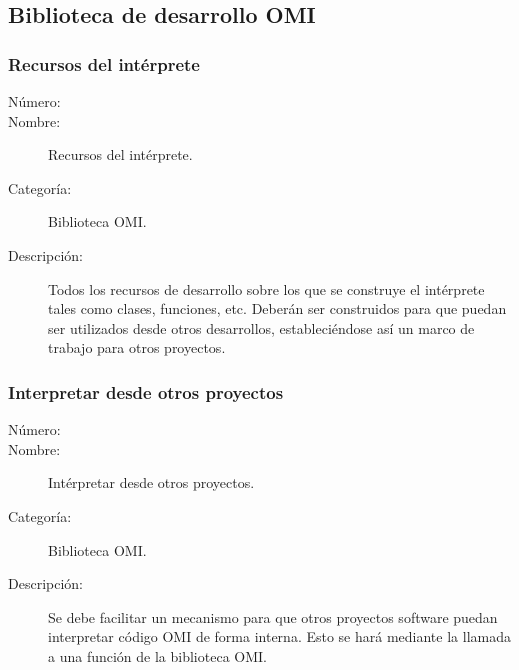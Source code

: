 \subsection{Biblioteca de desarrollo OMI}

\subsubsection{Recursos del intérprete}
\begin{framed}
	\begin{description}
		\item [Número:] \cn
		\item [Nombre:] Recursos del intérprete.
		\item [Categoría:] Biblioteca OMI.
		\item [Descripción:] Todos los recursos de desarrollo sobre los que se construye el intérprete tales 
      como clases, funciones, etc. Deberán ser construidos para que puedan ser utilizados desde otros desarrollos,
      estableciéndose así un marco de trabajo para otros proyectos. 
	\end {description}
\end{framed}

\subsubsection{Interpretar desde otros proyectos}
\begin{framed}
	\begin{description}
		\item [Número:] \cn
		\item [Nombre:] Intérpretar desde otros proyectos.
		\item [Categoría:] Biblioteca OMI.
		\item [Descripción:] Se debe facilitar un mecanismo para que otros proyectos software puedan interpretar código
      OMI de forma interna. Esto se hará mediante la llamada a una función de la biblioteca OMI.
	\end {description}
\end{framed}


